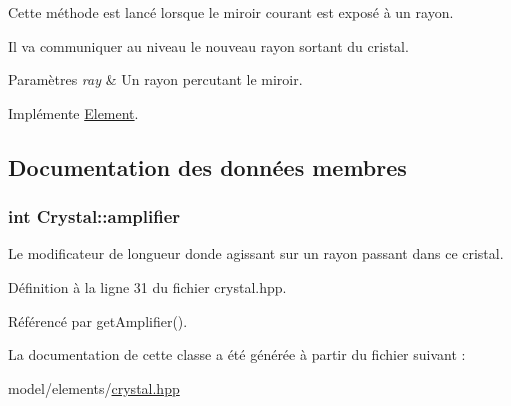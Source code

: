Cette méthode est lancé lorsque le miroir courant est exposé à un rayon. 

Il va communiquer au niveau le nouveau rayon sortant du cristal.


\begin{DoxyParams}{Paramètres}
{\em ray} & Un rayon percutant le miroir. \\
\hline
\end{DoxyParams}


Implémente \hyperlink{classElement_aa87116bb9422d64169b2ebf03831df9b}{Element}.



\subsection{Documentation des données membres}
\hypertarget{classCrystal_a6732b62ec55a56f8d29249281e432cc9}{}
\subsubsection[{amplifier}]{\setlength{\rightskip}{0pt plus 5cm}int Crystal\+::amplifier\hspace{0.3cm}{\ttfamily [private]}}\label{classCrystal_a6732b62ec55a56f8d29249281e432cc9}


Le modificateur de longueur d\textquotesingle{}onde agissant sur un rayon passant dans ce cristal. 



Définition à la ligne 31 du fichier crystal.\+hpp.



Référencé par get\+Amplifier().



La documentation de cette classe a été générée à partir du fichier suivant \+:\begin{DoxyCompactItemize}
\item 
model/elements/\hyperlink{crystal_8hpp}{crystal.\+hpp}\end{DoxyCompactItemize}
